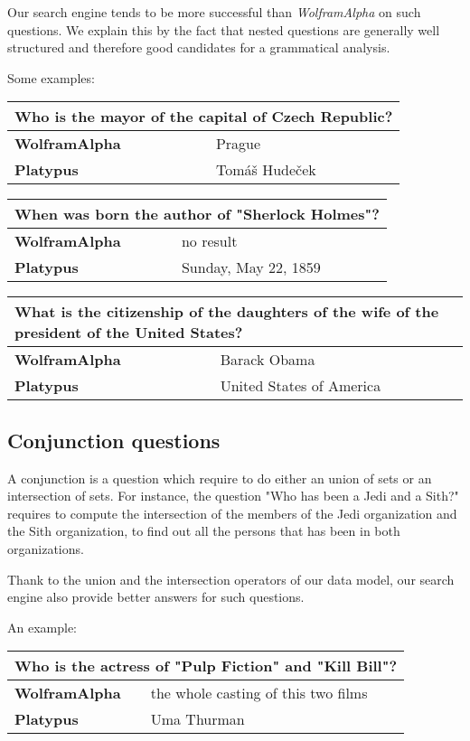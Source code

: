 Our search engine tends to be more successful than \emph{WolframAlpha}
on such questions. We explain this by the fact that nested questions are generally
well structured and therefore good candidates for a grammatical analysis.

Some examples:

\begin{tabular}{l|l}
    \multicolumn{2}{l}{Who is the mayor of the capital of Czech Republic?} \\
    \hline
    \textbf{WolframAlpha} & Prague\\
    \textbf{Platypus} & Tomáš Hudeček\\
\end{tabular}

\begin{tabular}{l|l}
    \multicolumn{2}{l}{When was born the author of "Sherlock Holmes"?} \\
    \hline
    \textbf{WolframAlpha} & no result\\
    \textbf{Platypus} & Sunday, May 22, 1859\\
\end{tabular}

\begin{tabular}{l|l}
    \multicolumn{2}{l}{What is the citizenship of the daughters of the wife of the president of the United States?} \\
    \hline
    \textbf{WolframAlpha} & Barack Obama\\
    \textbf{Platypus} & United States of America\\
\end{tabular}

\subsection{Conjunction questions}

A conjunction is a question which require to do either an union of sets or an intersection
of sets. For instance, the question "Who has been a Jedi and a Sith?" requires to
compute the intersection of the members of the Jedi organization and the Sith organization,
to find out all the persons that has been in both organizations.

Thank to the union and the intersection operators of our data model, our search engine also
provide better answers for such questions.

An example:

\begin{tabular}{l|l}
    \multicolumn{2}{l}{Who is the actress of "Pulp Fiction" and "Kill Bill"?} \\
    \hline
    \textbf{WolframAlpha} & the whole casting of this two films\\
    \textbf{Platypus} & Uma Thurman\\
\end{tabular}


